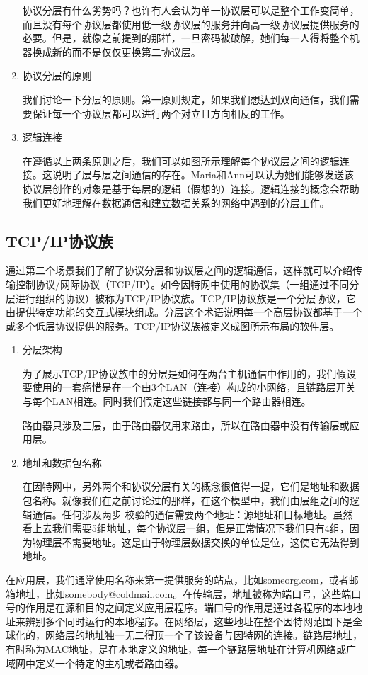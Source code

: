\begin{enumerate}
	协议分层有什么劣势吗？也许有人会认为单一协议层可以是整个工作变简单，而且没有每个协议层都使用低一级协议层的服务并向高一级协议层提供服务的必要。但是，就像之前提到的那样，一旦密码被破解，她们每一人得将整个机器换成新的而不是仅仅更换第二协议层。
	\item 协议分层的原则

	我们讨论一下分层的原则。第一原则规定，如果我们想达到双向通信，我们需要保证每一个协议层都可以进行两个对立且方向相反的工作。

	\item 逻辑连接

	在遵循以上两条原则之后，我们可以如图所示理解每个协议层之间的逻辑连接。这说明了层与层之间通信的存在。Maria和Ann可以认为她们能够发送该协议层创作的对象是基于每层的逻辑（假想的）连接。逻辑连接的概念会帮助我们更好地理解在数据通信和建立数据关系的网络中遇到的分层工作。

\end{enumerate}
\subsection{TCP/IP协议族}
通过第二个场景我们了解了协议分层和协议层之间的逻辑通信，这样就可以介绍传输控制协议/网际协议（TCP/IP）。如今因特网中使用的协议集（一组通过不同分层进行组织的协议）被称为TCP/IP协议族。TCP/IP协议族是一个分层协议，它由提供特定功能的交互式模块组成。分层这个术语说明每一个高层协议都基于一个或多个低层协议提供的服务。TCP/IP协议族被定义成图所示布局的软件层。
\begin{enumerate}
	\item 分层架构

	为了展示TCP/IP协议族中的分层是如何在两台主机通信中作用的，我们假设要使用的一套痛惜是在一个由3个LAN（连接）构成的小网络，且链路层开关与每个LAN相连。同时我们假定这些链接都与同一个路由器相连。

	路由器只涉及三层，由于路由器仅用来路由，所以在路由器中没有传输层或应用层。

	\item 地址和数据包名称

	在因特网中，另外两个和协议分层有关的概念很值得一提，它们是地址和数据包名称。就像我们在之前讨论过的那样，在这个模型中，我们由层组之间的逻辑通信。任何涉及两步 校验的通信需要两个地址：源地址和目标地址。虽然看上去我们需要5组地址，每个协议层一组，但是正常情况下我们只有4组，因为物理层不需要地址。这是由于物理层数据交换的单位是位，这使它无法得到地址。
\end{enumerate}

	在应用层，我们通常使用名称来第一提供服务的站点，比如someorg.com，或者邮箱地址，比如somebody@coldmail.com。在传输层，地址被称为端口号，这些端口号的作用是在源和目的之间定义应用层程序。端口号的作用是通过各程序的本地地址来辨别多个同时运行的本地程序。在网络层，这些地址在整个因特网范围下是全球化的，网络层的地址独一无二得顶一个了该设备与因特网的连接。链路层地址，有时称为MAC地址，是在本地定义的地址，每一个链路层地址在计算机网络或广域网中定义一个特定的主机或者路由器。
